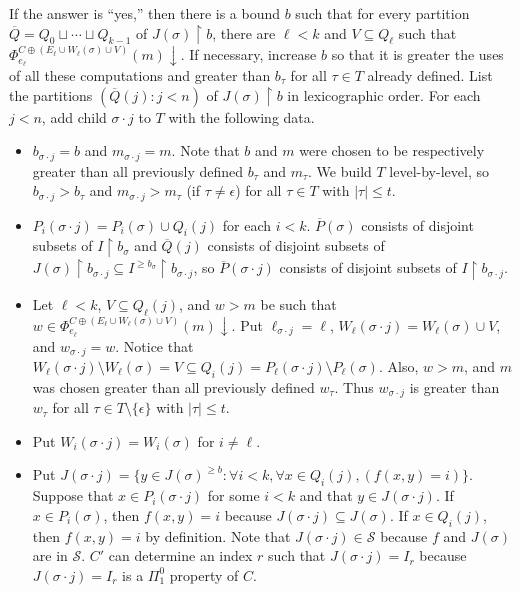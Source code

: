 \documentclass{article}
\def\Sc{\mathcal{S}}
\newcommand{\uh}{\upharpoonright}
\newcommand{\converge}{\!\!\downarrow}
\def\qt#1{``#1''}%
\newcommand{\ol}[1]{\overline{#1}}
\numberwithin{theorem}{section}
\begin{document}
If the answer is \qt{yes,} then there is a bound $b$ such that for every partition $\ol{Q} = Q_0 \sqcup \cdots \sqcup Q_{k-1}$ of $J(\sigma) \uh b$, there are $\ell < k$ and $V \subseteq Q_\ell$ such that $\Phi_{e_\ell}^{C \oplus (E_\ell \cup W_\ell(\sigma) \cup V)}(m)\converge$.  If necessary, increase $b$ so that it is greater the uses of all these computations and greater than $b_\tau$ for all $\tau \in T$ already defined.  List the partitions $(\ol{Q}(j) : j < n)$ of $J(\sigma) \uh b$ in lexicographic order.  For each $j < n$, add child $\sigma \cdot j$ to $T$ with the following data.
\begin{itemize}
\item $b_{\sigma \cdot j} = b$ and $m_{\sigma \cdot j} = m$.  Note that $b$ and $m$ were chosen to be respectively greater than all previously defined $b_\tau$ and $m_\tau$.  We build $T$ level-by-level, so $b_{\sigma \cdot j} > b_\tau$ and $m_{\sigma \cdot j} > m_\tau$ (if $\tau \neq \epsilon$) for all $\tau \in T$ with $|\tau| \leq t$.

\item $P_i(\sigma \cdot j) = P_i(\sigma) \cup Q_i(j)$ for each $i < k$.  $\ol{P}(\sigma)$ consists of disjoint subsets of $I \uh b_\sigma$ and $\ol{Q}(j)$ consists of disjoint subsets of $J(\sigma) \uh b_{\sigma \cdot j} \subseteq I^{\geq b_\sigma}\uh b_{\sigma \cdot j}$, so $\ol{P}(\sigma \cdot j)$ consists of disjoint subsets of $I \uh b_{\sigma \cdot j}$.

\item  Let $\ell < k$, $V \subseteq Q_\ell(j)$, and $w > m$ be such that $w \in \Phi_{e_\ell}^{C \oplus (E_\ell \cup W_\ell(\sigma) \cup V)}(m)\converge$.  Put $\ell_{\sigma \cdot j} = \ell$,  $W_\ell(\sigma \cdot j) = W_\ell(\sigma) \cup V$, and $w_{\sigma \cdot j} = w$.  Notice that $W_\ell(\sigma \cdot j) \setminus W_\ell(\sigma) = V \subseteq Q_i(j) = P_\ell(\sigma \cdot j) \setminus P_\ell(\sigma)$.  Also, $w > m$, and $m$ was chosen greater than all previously defined $w_\tau$.  Thus $w_{\sigma \cdot j}$ is greater than $w_\tau$ for all $\tau \in T \setminus \{\epsilon\}$ with $|\tau| \leq t$.

\item Put $W_i(\sigma \cdot j) = W_i(\sigma)$ for $i \neq \ell$.

\item Put $J(\sigma \cdot j) = \{y \in J(\sigma)^{\geq b} : \forall i < k, \forall x \in Q_i(j), (f(x,y) = i)\}$.  Suppose that $x \in P_i(\sigma \cdot j)$ for some $i < k$ and that $y \in J(\sigma \cdot j)$.  If $x \in P_i(\sigma)$, then $f(x,y) = i$ because $J(\sigma \cdot j) \subseteq J(\sigma)$.  If $x \in Q_i(j)$, then $f(x,y) = i$ by definition.  Note that $J(\sigma \cdot j) \in \Sc$ because $f$ and $J(\sigma)$ are in $\Sc$.  $C'$ can determine an index $r$ such that $J(\sigma \cdot j) = I_r$ because $J(\sigma \cdot j) = I_r$ is a $\Pi^0_1$ property of $C$.
\end{itemize}
\end{document}

